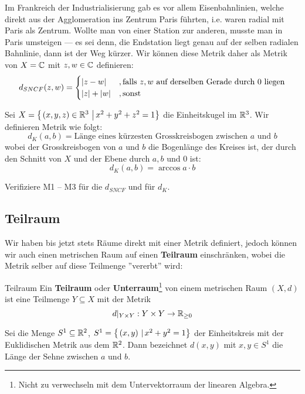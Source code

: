 \begin{example} Im Frankreich der Industrialisierung gab es vor allem Eisenbahnlinien, welche direkt aus der Agglomeration ins Zentrum Paris führten, i.e. waren radial mit Paris als Zentrum. Wollte man von einer Station zur anderen, musste man in Paris umsteigen --- es sei denn, die Endstation liegt genau auf der selben radialen Bahnlinie, dann ist der Weg kürzer. Wir können diese Metrik daher als Metrik von $X = \mathbb{C}$ mit $z,w \in \mathbb{C}$ definieren:
$$d_{SNCF}(z,w) = \begin{cases} \left|z-w\right| &, \text{falls $z,w$ auf derselben Gerade durch 0 liegen} \\ \left|z\right| + \left|w\right| & , \text{sonst} \end{cases}$$
\end{example}

\begin{example} Sei $X = \left\{\left.(x,y,z) \in \mathbb{R}^3 \ \right| x^2+y^2+z^2=1 \right\}$ die Einheitskugel im $\mathbb{R}^3$. Wir definieren Metrik wie folgt:
$$d_K(a,b) = \text{Länge eines kürzesten Grosskreisbogen zwischen $a$ und $b$}$$
wobei der Grosskreisbogen von $a$ und $b$ die Bogenlänge des Kreises ist, der durch den Schnitt von $X$ und der Ebene durch $a,b$ und 0 ist:
$$d_K(a,b) = \arccos{a\cdot b}$$
\end{example}
\begin{exercise} Verifiziere M1 -- M3 für die $d_{SNCF}$ und für $d_K$.\end{exercise}

\subsection{Teilraum}
Wir haben bis jetzt stets Räume direkt mit einer Metrik definiert, jedoch können wir auch einen metrischen Raum auf einen \textbf{Teilraum} einschränken, wobei die Metrik selber auf diese Teilmenge ''vererbt'' wird:

\begin{definition}{Teilraum}{}
Ein \textbf{Teilraum} oder \textbf{Unterraum}\footnote{Nicht zu verwechseln mit dem Untervektorraum der linearen Algebra.} von einem metrischen Raum $(X,d)$ ist eine Teilmenge $Y \subseteq X$ mit der Metrik
$$d\vert_{Y\times Y}: Y \times Y \to \mathbb{R}_{\geq 0}$$
\end{definition}

\begin{example} Sei die Menge $S^1 \subseteq \mathbb{R}^2$, $S^1 = \left\{\left.(x,y) \ \right| x^2+y^2=1 \right\}$ der Einheitskreis mit der Euklidischen Metrik aus dem $\mathbb{R}^2$. Dann bezeichnet $d(x,y)$ mit $x,y \in S^1$ die Länge der Sehne zwischen $a$ und $b$.
\end{example}

